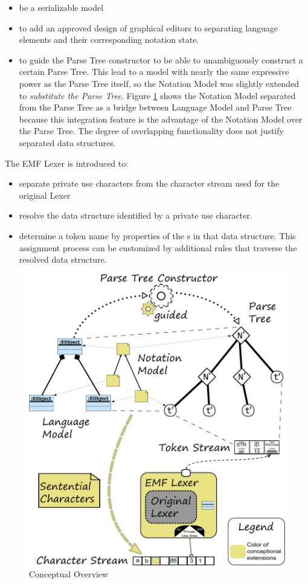 \begin{itemize}
	\item be a serializable model
	\item to add an approved design of graphical editors to separating language elements and their corresponding notation state.
	\item to guide the Parse Tree constructor to be able to unambiguously construct a certain Parse Tree. This lead to a model with nearly the same expressive power as the Parse Tree itself, so the Notation Model was slightly extended to \emph{substitute the Parse Tree}. Figure \ref{ConceptFigure} shows the Notation Model separated from the Parse Tree as a bridge between Language Model and Parse Tree because this integration feature is the advantage of the Notation Model over the Parse Tree. The degree of overlapping functionality does not justify separated data structures.
\end{itemize} 
The EMF Lexer is introduced to:
\begin{itemize}
	\item separate private use characters from the character stream used for the original Lexer
	\item resolve the data structure identified by a private use character.
	\item determine a token name by properties of the s in that data structure. This assignment process can be customized by additional rules that traverse the resolved data structure.
\end{itemize}


\begin{figure}
\centering
\includegraphics[scale=0.75]{gfx/ex/Concept} 
\caption{Conceptual Overview}
\label{ConceptFigure}
\end{figure}
